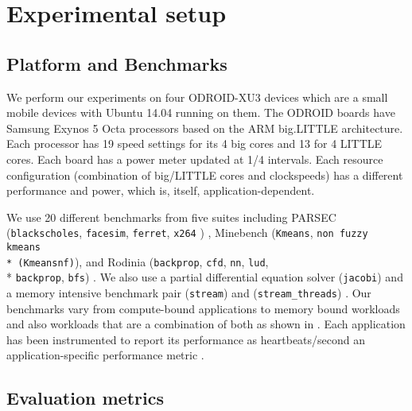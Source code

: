 \section{Experimental setup}

\subsection{Platform and Benchmarks}
We perform our experiments on four ODROID-XU3 devices which are a
small mobile devices with Ubuntu 14.04 running on them. The ODROID
boards have Samsung Exynos 5 Octa processors based on the ARM
big.LITTLE architecture.  Each processor has 19 speed settings for its 4 big cores and 13 for 4 LITTLE cores.
Each board has a power meter updated at 1/4 \ms intervals.  Each
resource configuration (combination of big/LITTLE cores and
clockspeeds) has a different performance and power, which is, itself,
application-dependent.

We use 20 different benchmarks from five suites including PARSEC
(\texttt{blackscholes}, \texttt{facesim}, \texttt{ferret}, \texttt{x264} ) \cite{parsec}, Minebench (\texttt{Kmeans}, \texttt{non
  fuzzy kmeans \\* (Kmeansnf)}), and Rodinia
(\texttt{backprop}, \texttt{cfd}, \texttt{nn}, \texttt{lud}, \\*
\texttt{backprop}, \texttt{bfs}) \cite{rodinia}.  We also use a
partial differential equation solver (\texttt{jacobi}) and a memory
intensive benchmark pair (\texttt{stream}) and
(\texttt{stream\_threads}) \cite{stream}. Our benchmarks vary from
compute-bound applications to memory bound workloads and also
workloads that are a combination of both as shown in
.  Each application has been instrumented
to report its performance as heartbeats/second an application-specific
performance metric \cite{POET}.



\subsection{Evaluation metrics}

